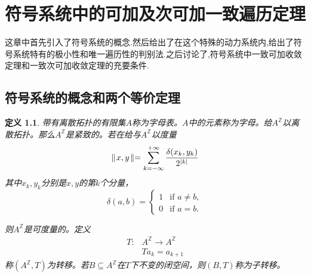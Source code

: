 \documentclass[a4paper,11pt,oneside]{book}
\newtheorem{definition}{\textbf{\hspace{0.7cm}定义}}[section]
\begin{document}
\chapter{符号系统中的可加及次可加一致遍历定理}
\thispagestyle{fancy}
这章中首先引入了符号系统的概念.然后给出了在这个特殊的动力系统内,给出了符号系统特有的极小性和唯一遍历性的判别法.之后讨论了,符号系统中一致可加收敛定理和一致次可加收敛定理的充要条件.
\section{符号系统的概念和两个等价定理}
\begin{definition}
带有离散拓扑的有限集$A$称为字母表。$A$中的元素称为字母。给$A^{\mathbb{Z}}$以离散拓扑。那么$A^{\mathbb{Z}}$是紧致的。若在给与$A^{\mathbb{Z}}$以度量$$\parallel\! x,y\!\parallel =\sum_{k=-\infty}^{+\infty}{\delta (x_k,y_k)\over 2^{|k|}}$$
其中$x_k,y_k$分别是$x,y$的第$k$个分量，
\begin{equation*}
\delta(a,b)=
\begin{cases}
1 &\text{if }a\neq b,\\
0 &\text{if }a=b.
\end{cases}
\end{equation*}

则$A^{\mathbb{Z}}$是可度量的。定义
\begin{align*}
T:& A^{\mathbb{Z}}\rightarrow A^{\mathbb{Z}}\\
  & Ta_k=a_{k+1}
\end{align*}
称$(A^{\mathbb{Z}},T)$为转移。若$B\subseteq A^{\mathbb{Z}}$在$T$下不变的闭空间，则$(B,T)$称为子转移。

\end{definition}
\end{document}
